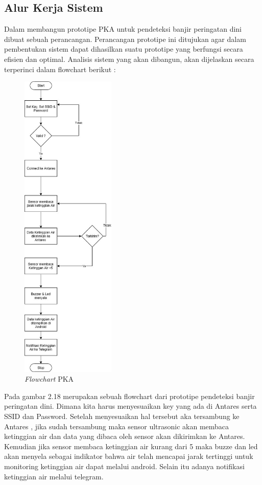 \subsection{Alur Kerja Sistem}
Dalam membangun prototipe PKA untuk pendeteksi banjir peringatan dini dibuat sebuah perancangan. Perancangan prototipe ini ditujukan agar dalam pembentukan sistem dapat dihasilkan suatu prototipe yang berfungsi secara efisien dan optimal. Analisis sistem yang akan dibangun, akan dijelaskan secara terperinci dalam flowchart berikut :
\begin{figure}[H]
\centering
\includegraphics[width=0.4\textwidth]{figures/flowchart.png}
\caption{ \textit{Flowchart} PKA}
\label{print}
\end{figure}

Pada gambar 2.18 merupakan sebuah flowchart dari prototipe pendeteksi banjir  peringatan  dini. Dimana kita harus menyesuaikan key yang ada di Antares serta SSID dan Password. Setelah menyesuaikan hal tersebut aka tersambung ke Antares , jika sudah tersambung maka sensor ultrasonic akan membaca ketinggian air dan data yang dibaca oleh sensor akan dikirimkan ke Antares. Kemudian jika sensor membaca ketinggian air kurang dari 5 maka buzze dan led akan menyela sebagai indikator bahwa air telah mencapai jarak tertinggi untuk monitoring ketinggian air dapat melalui android. Selain itu adanya notifikasi ketinggian air melalui telegram.

